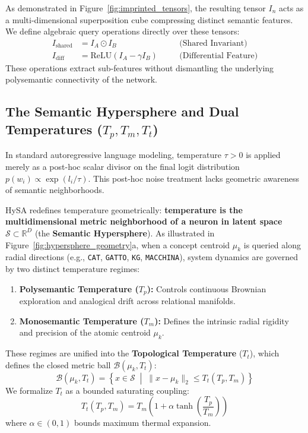 \documentclass[11pt,a4paper]{article}
\theoremstyle{definition}
\begin{document}
As demonstrated in Figure~\ref{fig:imprinted_tensors}, the resulting tensor $I_n$ acts as a multi-dimensional superposition cube compressing distinct semantic features. We define algebraic query operations directly over these tensors:
\begin{align}
    I_{\mathrm{shared}} &= I_A \odot I_B \quad &&\text{(Shared Invariant)} \\
    I_{\mathrm{diff}} &= \mathrm{ReLU}(I_A - \gamma I_B) \quad &&\text{(Differential Feature)}
\end{align}
These operations extract sub-features without dismantling the underlying polysemantic connectivity of the network.

\subsection{The Semantic Hypersphere and Dual Temperatures (\texorpdfstring{$T_p, T_m, T_t$}{Tp, Tm, Tt})}
In standard autoregressive language modeling, temperature $\tau > 0$ is applied merely as a post-hoc scalar divisor on the final logit distribution $p(w_i) \propto \exp(l_i / \tau)$. This post-hoc noise treatment lacks geometric awareness of semantic neighborhoods.

HySA redefines temperature geometrically: \textbf{temperature is the multidimensional metric neighborhood of a neuron in latent space $\mathcal{S} \subset \mathbb{R}^D$} (the \textbf{Semantic Hypersphere}). As illustrated in Figure~\ref{fig:hypersphere_geometry}a, when a concept centroid $\mu_k$ is queried along radial directions (e.g., \texttt{CAT}, \texttt{GATTO}, \texttt{KG}, \texttt{MACCHINA}), system dynamics are governed by two distinct temperature regimes:
\begin{enumerate}[leftmargin=*, itemsep=1.5pt]
    \item \textbf{Polysemantic Temperature ($T_p$):} Controls continuous Brownian exploration and analogical drift across relational manifolds.
    \item \textbf{Monosemantic Temperature ($T_m$):} Defines the intrinsic radial rigidity and precision of the atomic centroid $\mu_k$.
\end{enumerate}

These regimes are unified into the \textbf{Topological Temperature} ($T_t$), which defines the closed metric ball $\mathcal{B}(\mu_k, T_t)$:
\begin{equation}
    \mathcal{B}(\mu_k, T_t) = \left\{ x \in \mathcal{S} \;\middle|\; \| x - \mu_k \|_2 \le T_t(T_p, T_m) \right\}
\end{equation}
We formalize $T_t$ as a bounded saturating coupling:
\begin{equation}
    T_t(T_p, T_m) = T_m \left( 1 + \alpha \tanh\left( \frac{T_p}{T_m} \right) \right)
    \label{eq:tt_coupling}
\end{equation}
where $\alpha \in (0, 1)$ bounds maximum thermal expansion.
\end{document}
